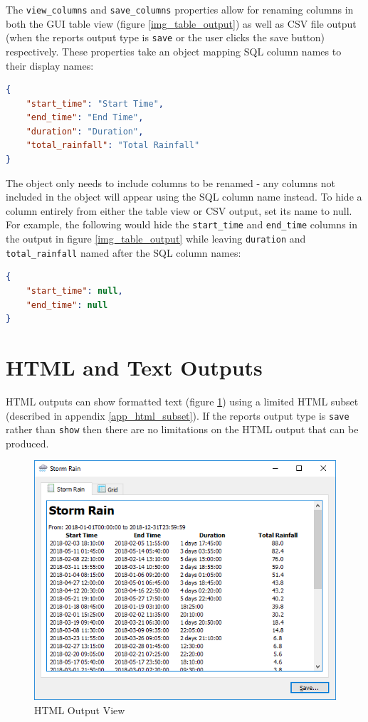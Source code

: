 \documentclass[a4paper,10pt]{book}
\begin{document}
The \verb|view_columns| and \verb|save_columns| properties allow for renaming columns in both the GUI table view (figure \ref{img_table_output}) as well as CSV file output (when the reports output type is \verb|save| or the user clicks the save button) respectively. These properties take an object mapping SQL column names to their display names:
\begin{lstlisting}[language=json]
{
	"start_time": "Start Time",
	"end_time": "End Time",
	"duration": "Duration",
	"total_rainfall": "Total Rainfall"        
}
\end{lstlisting}

The object only needs to include columns to be renamed - any columns not included in the object will appear using the SQL column name instead. To hide a column entirely from either the table view or CSV output, set its name to null. For example, the following would hide the \verb|start_time| and \verb|end_time| columns in the output in figure \ref{img_table_output} while leaving \verb|duration| and \verb|total_rainfall| named after the SQL column names:
\begin{lstlisting}[language=json]
{
	"start_time": null,
	"end_time": null
}
\end{lstlisting}


\section{HTML  and Text Outputs}
HTML outputs can show formatted text (figure \ref{img_html_output}) using a limited HTML subset (described in appendix \ref{app_html_subset}). If the reports output type is \verb|save| rather than \verb|show| then there are no limitations on the HTML output that can be produced.

\begin {figure}[!ht]
 \centering
 \includegraphics[scale=0.5]{images/html_output}
 \caption{HTML Output View}
 \label{img_html_output}
\end {figure}
\end{document}

